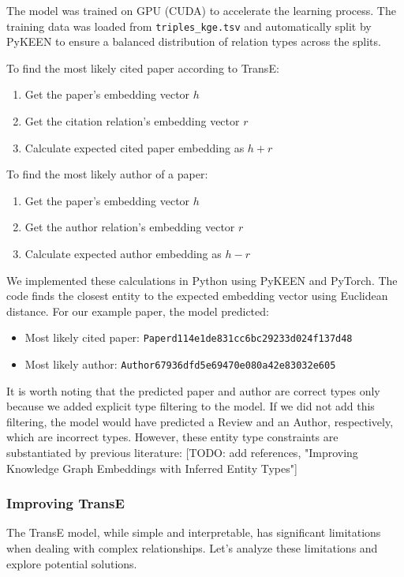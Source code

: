 \documentclass[10pt,a4paper]{article}
\begin{document}
The model was trained on GPU (CUDA) to accelerate the learning process. The training data was loaded from \texttt{triples\_kge.tsv} and automatically split by PyKEEN to ensure a balanced distribution of relation types across the splits.

To find the most likely cited paper according to TransE:
\begin{enumerate}
    \item Get the paper's embedding vector $h$
    \item Get the citation relation's embedding vector $r$
    \item Calculate expected cited paper embedding as $h + r$
\end{enumerate}

To find the most likely author of a paper:
\begin{enumerate}
    \item Get the paper's embedding vector $h$
    \item Get the author relation's embedding vector $r$
    \item Calculate expected author embedding as $h - r$
\end{enumerate}

We implemented these calculations in Python using PyKEEN and PyTorch. The code finds the closest entity to the expected embedding vector using Euclidean distance. For our example paper, the model predicted:
\begin{itemize}
    \item Most likely cited paper: \texttt{Paperd114e1de831cc6bc29233d024f137d48}
    \item Most likely author: \texttt{Author67936dfd5e69470e080a42e83032e605}
\end{itemize}

It is worth noting that the predicted paper and author are correct types only because we added explicit type filtering to the model. If we did not add this filtering, the model would have predicted a Review and an Author, respectively, which are incorrect types. However, these entity type constraints are substantiated by previous literature: [TODO: add references, "Improving Knowledge Graph Embeddings with Inferred Entity Types"]

\subsubsection{Improving TransE}

The TransE model, while simple and interpretable, has significant limitations when dealing with complex relationships. Let's analyze these limitations and explore potential solutions.
\end{document}
